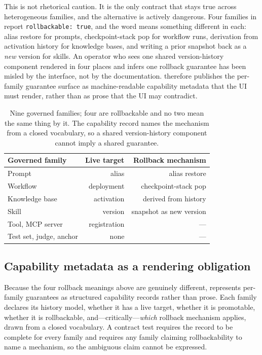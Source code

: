 \documentclass{article}
\newcommand{\code}[1]{\texttt{#1}}
\begin{document}
This is not rhetorical caution. It is the only contract that stays true across
heterogeneous families, and the alternative is actively dangerous. Four families in
\sys report \code{rollbackable: true}, and the word means something different in
each: alias restore for prompts, checkpoint-stack pop for workflow runs, derivation
from activation history for knowledge bases, and writing a prior snapshot back as a
\emph{new} version for skills. An operator who sees one shared version-history
component rendered in four places and infers one rollback guarantee has been misled
by the interface, not by the documentation. \sys therefore publishes the per-family
guarantee surface as machine-readable capability metadata that the UI must render,
rather than as prose that the UI may contradict.

\begin{table}[t]
\centering
\small
\setlength{\tabcolsep}{4pt}
\renewcommand{\arraystretch}{1.12}
\begin{tabular}{@{}lrr@{}}
\toprule
\textbf{Governed family} & \textbf{Live target} & \textbf{Rollback mechanism} \\
\midrule
Prompt          & alias      & alias restore \\
Workflow        & deployment & checkpoint-stack pop \\
Knowledge base  & activation & derived from history \\
Skill           & version    & snapshot as new version \\
\addlinespace
Tool, MCP server & registration & --- \\
Test set, judge, anchor & none & --- \\
\bottomrule
\end{tabular}
\caption{Nine governed families; four are rollbackable and no two mean the same
thing by it. The capability record names the mechanism from a closed vocabulary, so
a shared version-history component cannot imply a shared guarantee.}
\label{tab:families}
\end{table}

\subsection{Capability metadata as a rendering obligation}

Because the four rollback meanings above are genuinely different, \sys represents
per-family guarantees as structured capability records rather than prose. Each
family declares its history model, whether it has a live target, whether it is
promotable, whether it is rollbackable, and---critically---\emph{which} rollback
mechanism applies, drawn from a closed vocabulary. A contract test requires the
record to be complete for every family and requires any family claiming
rollbackability to name a mechanism, so the ambiguous claim cannot be expressed.
\end{document}
